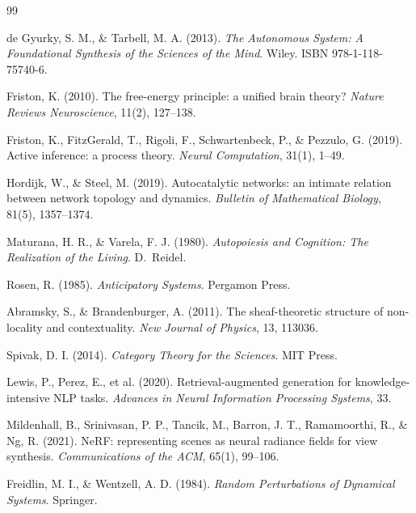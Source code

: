 \documentclass[11pt, oneside]{article}
\begin{document}
\newpage

\begin{thebibliography}{99}

de Gyurky, S. M., \& Tarbell, M. A. (2013).
\textit{The Autonomous System: A Foundational Synthesis of the Sciences of the Mind}.
Wiley. ISBN 978-1-118-75740-6.

Friston, K. (2010).
The free-energy principle: a unified brain theory?
\textit{Nature Reviews Neuroscience}, 11(2), 127--138.

Friston, K., FitzGerald, T., Rigoli, F., Schwartenbeck, P., \& Pezzulo, G. (2019).
Active inference: a process theory.
\textit{Neural Computation}, 31(1), 1--49.

Hordijk, W., \& Steel, M. (2019).
Autocatalytic networks: an intimate relation between network topology and dynamics.
\textit{Bulletin of Mathematical Biology}, 81(5), 1357--1374.

Maturana, H. R., \& Varela, F. J. (1980).
\textit{Autopoiesis and Cognition: The Realization of the Living}.
D.~Reidel.

Rosen, R. (1985).
\textit{Anticipatory Systems}.
Pergamon Press.

Abramsky, S., \& Brandenburger, A. (2011).
The sheaf-theoretic structure of non-locality and contextuality.
\textit{New Journal of Physics}, 13, 113036.

Spivak, D. I. (2014).
\textit{Category Theory for the Sciences}.
MIT Press.

Lewis, P., Perez, E., et al. (2020).
Retrieval-augmented generation for knowledge-intensive NLP tasks.
\textit{Advances in Neural Information Processing Systems}, 33.

Mildenhall, B., Srinivasan, P. P., Tancik, M., Barron, J. T., Ramamoorthi, R.,
\& Ng, R. (2021).
NeRF: representing scenes as neural radiance fields for view synthesis.
\textit{Communications of the ACM}, 65(1), 99--106.

Freidlin, M. I., \& Wentzell, A. D. (1984).
\textit{Random Perturbations of Dynamical Systems}.
Springer.

\end{thebibliography}
\end{document}
